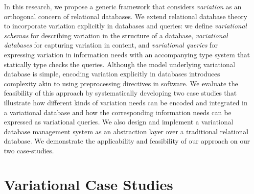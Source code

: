 \documentclass[11pt]{article}
\begin{document}
%
%
%
%
In this research, we propose a generic framework that considers
\emph{variation} as an orthogonal concern of relational databases. 
We extend relational database theory to incorporate variation
explicitly in databases and queries:
we define \emph{variational schemas} for describing variation in the structure of a database,
\emph{variational databases} for capturing variation in content,
and \emph{variational queries} for expressing variation in information needs with an
accompanying type system that statically type checks the queries.
%
Although the model underlying variational database is simple, encoding variation
explicitly in databases introduces complexity akin to using preprocessing
directives in software. 
We evaluate the feasibility of this approach by systematically developing two case studies
that illustrate how different kinds of variation needs can be encoded and
integrated in a variational database and how the
corresponding information needs can be expressed as variational queries.
%
We also design and implement a variational database management system as an abstraction layer over a traditional relational database. We demonstrate the applicability and feasibility of our approach on our two case-studies.











\newpage

%


\appendix
\section{Variational Case Studies}
\label{app:db}



\end{document}
